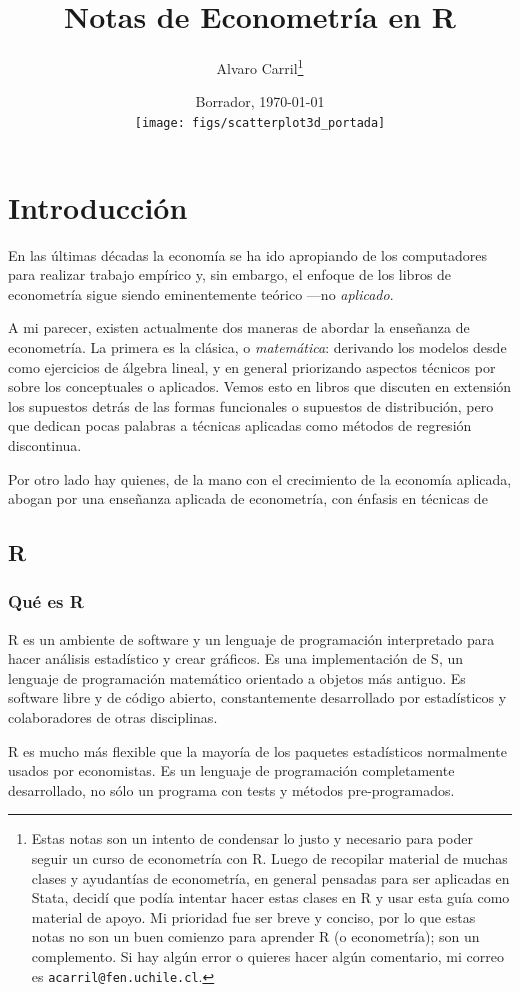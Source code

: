 \documentclass{report}\usepackage[]{graphicx}\usepackage[]{color}
\title{Notas de Econometría en R}
\author{Alvaro Carril\thanks{Estas notas son un intento de condensar lo justo y necesario para poder seguir un curso de econometría con R.
Luego de recopilar material de muchas clases y ayudantías de econometría, en general pensadas para ser aplicadas en Stata, decidí que podía intentar hacer estas clases en R y usar esta guía como material de apoyo.
Mi prioridad fue ser breve y conciso, por lo que estas notas no son un buen comienzo para aprender R (o econometría); son un complemento.
Si hay algún error o quieres hacer algún comentario, mi correo es \texttt{acarril@fen.uchile.cl}.}}
\date{Borrador, \today \\
  \texttt{[image: figs/scatterplot3d\_portada]}
}
\begin{document}
\maketitle
\tableofcontents

\clearpage




\chapter{Introducción}

En las últimas décadas la economía se ha ido apropiando de los computadores para realizar trabajo empírico y, sin embargo, el enfoque de los libros de econometría sigue siendo eminentemente teórico ---no \emph{aplicado}.

A mi parecer, existen actualmente dos maneras de abordar la enseñanza de econometría. La primera es la clásica, o \emph{matemática}: derivando los modelos desde como ejercicios de álgebra lineal, y en general priorizando aspectos técnicos por sobre los conceptuales o aplicados. Vemos esto en libros que discuten en extensión los supuestos detrás de las formas funcionales o supuestos de distribución, pero que dedican pocas palabras a técnicas aplicadas como métodos de regresión discontinua.

Por otro lado hay quienes, de la mano con el crecimiento de la economía aplicada, abogan por una enseñanza aplicada de econometría, con énfasis en técnicas de 

\section{R}

\subsection{Qué es R}

R es un ambiente de software y un lenguaje de programación interpretado para hacer análisis estadístico y crear gráficos. Es una implementación de S, un lenguaje de programación matemático orientado a objetos más antiguo. Es software libre y de código abierto, constantemente desarrollado por estadísticos y colaboradores de otras disciplinas.

R es mucho más flexible que la mayoría de los paquetes estadísticos normalmente usados por economistas. Es un lenguaje de programación completamente desarrollado, no sólo un programa con tests y métodos pre-programados.
\end{document}
